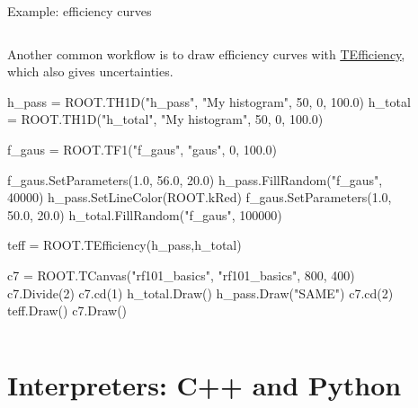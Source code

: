 \documentclass[aspectratio=169]{beamer}
\newcommand{\myfigure}[2]{
    \begin{figure}
        \makebox[\textwidth]{%
            \texttt{[image: \#2]}
        }
    \end{figure}
}
\newcommand{\myhref}[2]{{\color{blue}\href{#1}{\underline{#2}}}}
\begin{document}
\begin{frame}[fragile]{Example: efficiency curves}

    \begin{columns}
        \begin{column}{0.57\textwidth}
    Another common workflow is to draw efficiency curves with \myhref{https://root.cern.ch/doc/master/classTEfficiency.html}{TEfficiency}, which also gives uncertainties.

            \begin{myterminaltiny}
h_pass = ROOT.TH1D("h_pass", "My histogram", 50, 0, 100.0)
h_total = ROOT.TH1D("h_total", "My histogram", 50, 0, 100.0)

f_gaus = ROOT.TF1("f_gaus", "gaus", 0, 100.0)

f_gaus.SetParameters(1.0, 56.0, 20.0)
h_pass.FillRandom("f_gaus", 40000)
h_pass.SetLineColor(ROOT.kRed)
f_gaus.SetParameters(1.0, 50.0, 20.0)
h_total.FillRandom("f_gaus", 100000)

teff = ROOT.TEfficiency(h_pass,h_total)

c7 = ROOT.TCanvas("rf101_basics", "rf101_basics", 800, 400)
c7.Divide(2)
c7.cd(1)
h_total.Draw()
h_pass.Draw("SAME")
c7.cd(2)
teff.Draw()
c7.Draw()
            \end{myterminaltiny}

        \end{column}
        \begin{column}{0.43\textwidth}
            \vspace{-7mm}
            \myfigure{1.0}{tefficiency_1.pdf}
            \vspace{-7mm}
            \myfigure{1.0}{tefficiency_2.pdf}
        \end{column}
    \end{columns}
\end{frame}

\section{Interpreters: C++ and Python}
\end{document}
